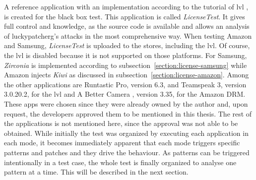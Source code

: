 \newline
A reference application with an implementation according to the tutorial of \gls{lvl} \cite{developersLicensingAdding}, is created for the black box test.
This application is called \textit{LicenseTest}.
It gives full control and knowledge, as the source code is available and allows an analysis of \gls{luckypatcherg}’s attacks in the most comprehensive way.
\newline
When testing Amazon and Samsung, \textit{LicenseTest} is uploaded to the stores, including the \gls{lvl}.
Of course, the \gls{lvl} is disabled because it is not supported on those platforms.
For Samsung, \textit{Zirconia} is implemented according to subsection~\ref{section:license-samsung} while Amazon injects \textit{Kiwi} as discussed in subsection~\ref{section:license-amazon}.
\newline
Among the other applications are Runtastic Pro\cite{runtasticApp}, version 6.3, and Teamspeak 3\cite{teamspeakApp}, version 3.0.20.2, for the \gls{lvl} and A Better Camera \cite{abettercamera}, version 3.35, for the Amazon DRM.
These apps were chosen since they were already owned by the author and, upon request, the developers approved them to be mentioned in this thesis.
The rest of the applications is not mentioned here, since the approval was not able to be obtained.
\newline
While initially the test was organized by executing each application in each mode, it becomes immediately apparent that each mode triggers specific patterns and patches and they drive the behaviour.
As patterns can be triggered intentionally in a test case, the whole test is finally organized to analyse one pattern at a time.
This will be described in the next section.
